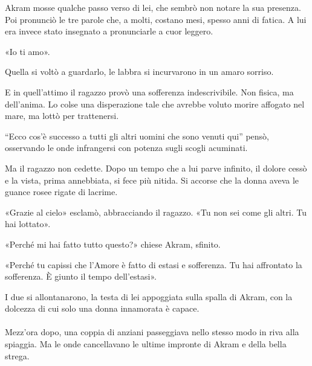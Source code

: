\documentclass[a4paper,12pt]{book}
\begin{document}
Akram mosse qualche passo verso di lei, che sembrò non notare la sua presenza.
Poi pronunciò le tre parole che, a molti, costano mesi, spesso anni di fatica.
A lui era invece stato insegnato a pronunciarle a cuor leggero.

«Io ti amo».

Quella si voltò a guardarlo, le labbra si incurvarono in un amaro sorriso.

E in quell'attimo il ragazzo provò una sofferenza indescrivibile. Non fisica,
ma dell'anima. Lo colse una disperazione tale che avrebbe voluto morire affogato
nel mare, ma lottò per trattenersi.

``Ecco cos'è successo a tutti gli altri uomini che sono venuti qui'' pensò,
osservando le onde infrangersi con potenza sugli scogli acuminati.

Ma il ragazzo non cedette. Dopo un tempo che a lui parve infinito, il dolore
cessò e la vista, prima annebbiata, si fece più nitida. Si accorse che la
donna aveva le guance rosee rigate di lacrime.

«Grazie al cielo» esclamò, abbracciando il ragazzo. «Tu non sei come gli
altri. Tu hai lottato».

«Perché mi hai fatto tutto questo?» chiese Akram, sfinito.

«Perché tu capissi che l'Amore è fatto di estasi e sofferenza. Tu hai
affrontato la sofferenza. È giunto il tempo dell'estasi».

I due si allontanarono, la testa di lei appoggiata sulla spalla di Akram, con la
dolcezza di cui solo una donna innamorata è capace.

\paragraph{}
Mezz'ora dopo, una coppia di anziani passeggiava nello stesso modo in riva alla
spiaggia. Ma le onde cancellavano le ultime impronte di Akram e della bella
strega.
\end{document}
